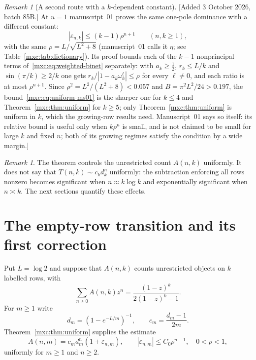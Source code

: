 \documentclass[11pt]{article}
\numberwithin{equation}{section}
\theoremstyle{definition}
\theoremstyle{remark}
\newtheorem{remark}[theorem]{Remark}
\begin{document}
\begin{remark}[A second route with a $k$-dependent constant]\label{mxc:rem:uniform-ms01}
[Added 3 October 2026, batch 85B.] At $u=1$ manuscript~01 proves the same
one-pole dominance with a different constant:
\begin{equation}\label{mxc:eq:uniform-ms01}
 |\varepsilon_{n,k}|\le(k-1)\rho^{n+1}\qquad(n,k\ge1),
\end{equation}
with the same $\rho=L/\sqrt{L^2+8}$ (manuscript~01 calls it $\eta$; see
Table~\ref{mxc:tab:dictionary}). Its proof bounds each of the $k-1$
nonprincipal terms of~\eqref{mxc:eq:weighted-binet} separately: with
$a_k\ge\frac12$, $r_k\le L/k$ and $\sin(\pi/k)\ge2/k$ one gets
$r_k/|1-a_k\omega_k^\ell|\le\rho$ for every $\ell\ne0$, and each ratio is
at most $\rho^{n+1}$. Since $\rho^2=L^2/(L^2+8)<0.057$ and
$B=\pi^2L^2/24>0.197$, the bound~\eqref{mxc:eq:uniform-ms01} is the sharper
one for $k\le4$ and Theorem~\ref{mxc:thm:uniform} for $k\ge5$; only
Theorem~\ref{mxc:thm:uniform} is uniform in $k$, which the growing-row
results need. Manuscript~01 says so itself: its relative bound is
useful only when $k\rho^n$ is small, and is not claimed to be small for
large $k$ and fixed $n$; both of its growing regimes satisfy the
condition by a wide margin.]
\end{remark}

\begin{remark}
The theorem controls the unrestricted count $A(n,k)$ uniformly. It does
not say that $T(n,k)\sim c_kd_k^n$ uniformly: the subtraction enforcing
all rows nonzero becomes significant when $n\approx k\log k$ and
exponentially significant when $n\asymp k$. The next sections quantify
these effects.
\end{remark}

\section{The empty-row transition and its first correction}\label{mxc:sec:poisson}

Put $L=\log 2$ and suppose that $A(n,k)$ counts unrestricted objects on
$k$ labelled rows, with
\[
 \sum_{n\geq0}A(n,k)z^n
 =\frac{(1-z)^k}{2(1-z)^k-1}.
\]
For $m\geq1$ write
\[
 d_m=(1-e^{-L/m})^{-1},\qquad
 c_m=\frac{d_m-1}{2m}.
\]
Theorem~\ref{mxc:thm:uniform} supplies the estimate
\begin{equation}\label{mxc:eq:pc-pole}
 A(n,m)=c_m d_m^n(1+\varepsilon_{n,m}),\qquad
 |\varepsilon_{n,m}|\leq C_0\rho^{n-1},
 \quad 0<\rho<1,
\end{equation}
uniformly for $m\geq1$ and $n\geq2$.
\end{document}
